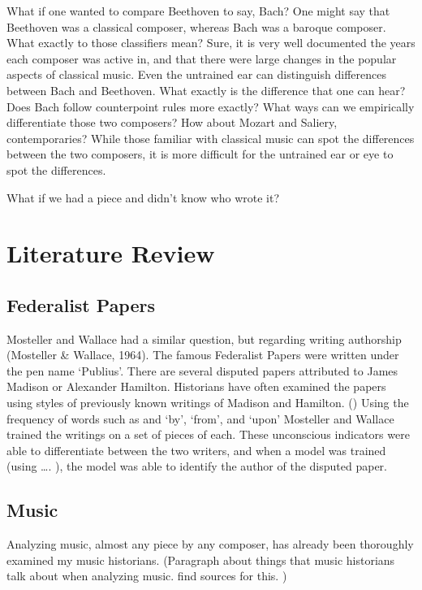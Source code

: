 \documentclass[12pt,twoside]{reedthesis}
\theoremstyle{definition}
\theoremstyle{definition}
\theoremstyle{definition}
\theoremstyle{remark}
\begin{document}
What if one wanted to compare Beethoven to say, Bach? One might say that
Beethoven was a classical composer, whereas Bach was a baroque composer.
What exactly to those classifiers mean? Sure, it is very well documented
the years each composer was active in, and that there were large changes
in the popular aspects of classical music. Even the untrained ear can
distinguish differences between Bach and Beethoven. What exactly is the
difference that one can hear? Does Bach follow counterpoint rules more
exactly? What ways can we empirically differentiate those two composers?
How about Mozart and Saliery, contemporaries? While those familiar with
classical music can spot the differences between the two composers, it
is more difficult for the untrained ear or eye to spot the differences.

What if we had a piece and didn't know who wrote it?

\section{Literature Review}\label{literature-review}

\subsection{Federalist Papers}\label{federalist-papers}

Mosteller and Wallace had a similar question, but regarding writing
authorship (Mosteller \& Wallace, 1964). The famous Federalist Papers
were written under the pen name `Publius'. There are several disputed
papers attributed to James Madison or Alexander Hamilton. Historians
have often examined the papers using styles of previously known writings
of Madison and Hamilton. () Using the frequency of words such as and
`by', `from', and `upon' Mosteller and Wallace trained the writings on a
set of pieces of each. These unconscious indicators were able to
differentiate between the two writers, and when a model was trained
(using \ldots{}. ), the model was able to identify the author of the
disputed paper.

\subsection{Music}\label{music}

Analyzing music, almost any piece by any composer, has already been
thoroughly examined my music historians. (Paragraph about things that
music historians talk about when analyzing music. find sources for this.
)
\end{document}
